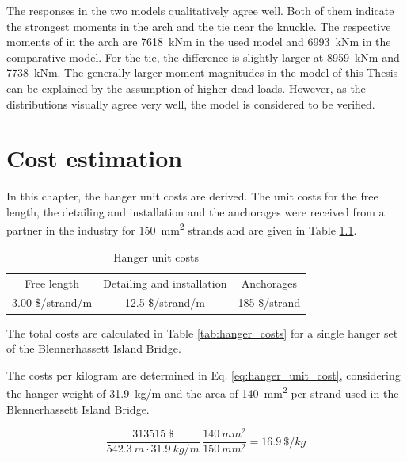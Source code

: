 The responses in the two models qualitatively agree well. Both of them indicate the strongest moments in the arch and the tie near the knuckle. The respective moments of in the arch are \SI{7618}{kNm} in the used model and \SI{6993}{kNm} in the comparative model. For the tie, the difference is slightly larger at \SI{8959}{kNm} and \SI{7738}{kNm}. The generally larger moment magnitudes in the model of this Thesis can be explained by the assumption of higher dead loads. However, as the distributions visually agree very well, the model is considered to be verified.


\chapter{Cost estimation} \label{app:cost}
In this chapter, the hanger unit costs are derived. The unit costs for the free length, the detailing and installation and the anchorages were received from a partner in the industry for \SI{150}{mm^2} strands and are given in Table \ref{tab:hanger_unit}.

\begin{table}[H]
\centering
\begin{tabular}{ccc}
\hline
Free length      & Detailing and installation & Anchorages    \\
3.00 \$/strand/m & 12.5 \$/strand/m           & 185 \$/strand \\ \hline
\end{tabular}
\caption{Hanger unit costs}
\label{tab:hanger_unit}
\end{table}

The total costs are calculated in Table \ref{tab:hanger_costs} for a single hanger set of the Blennerhassett Island Bridge. 



The costs per kilogram are determined in Eq. \ref{eq:hanger_unit_cost}, considering the hanger weight of \SI{31.9}{kg/m} and the area of \SI{140}{mm^2} per strand used in the Blennerhassett Island Bridge.

\begin{equation}
    \frac{\SI{313515}{\$}}{\SI{542.3}{m} \cdot \SI{31.9}{kg/m}} \, \frac{\SI{140}{mm^2}}{\SI{150}{mm^2}}= \SI{16.9}{\$/kg}
    \label{eq:hanger_unit_cost}
\end{equation}

\newpage
